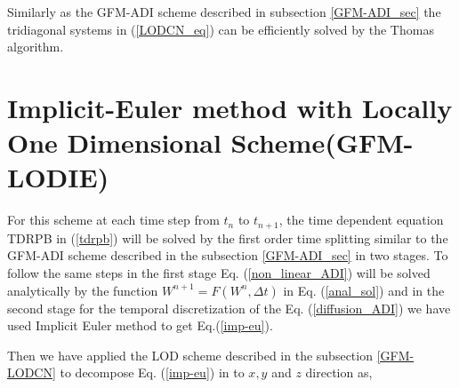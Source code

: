 Similarly as the GFM-ADI scheme described in subsection \ref{GFM-ADI_sec} the tridiagonal systems in (\ref{LODCN_eq}) can be efficiently solved by the Thomas algorithm. 


\section{Implicit-Euler method with Locally One Dimensional Scheme(GFM-LODIE)}

For this scheme at each time step from $t_n$ to $t_{n+1}$, the time dependent equation TDRPB in  (\ref{tdrpb}) will be solved by the first order time splitting  similar to the GFM-ADI scheme described in the subsection \ref{GFM-ADI_sec} in two stages. To follow the same steps in the first stage Eq. (\ref{non_linear_ADI}) will be solved analytically by the function $W^{n+1}=F(W^n,\Delta t)$ in Eq. (\ref{anal_sol}) and in the second stage for the temporal discretization of the Eq.  (\ref{diffusion_ADI}) we have used Implicit Euler method to get Eq.(\ref{imp-eu}). 
 
 Then we have applied the LOD scheme described in the subsection \ref{GFM-LODCN} to decompose Eq. (\ref{imp-eu})  in to $x,y$ and $z$ direction as, 
 
